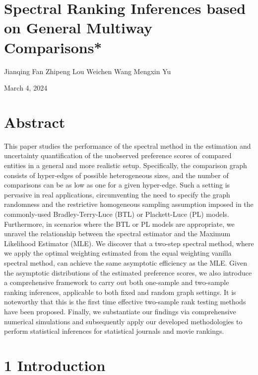



\section{Spectral Ranking Inferences based on General Multiway
Comparisons*}\label{spectral-ranking-inferences-based-on-general-multiway-comparisons}

Jianqing Fan Zhipeng Lou Weichen Wang Mengxin Yu

March 4, 2024

\section{Abstract}\label{abstract}

This paper studies the performance of the spectral method in the estimation and uncertainty quantification of the unobserved preference scores of compared entities in a general and more realistic setup. Specifically, the comparison graph consists of hyper-edges of possible heterogeneous sizes, and the number of comparisons can be as low as one for a given hyper-edge. Such a setting is pervasive in real applications, circumventing the need to specify the graph randomness and the restrictive homogeneous sampling assumption imposed in the commonly-used Bradley-Terry-Luce (BTL) or Plackett-Luce (PL) models. Furthermore, in scenarios where the BTL or PL models are appropriate, we unravel the relationship between the spectral estimator and the Maximum Likelihood Estimator (MLE). We discover that a two-step spectral method, where we apply the optimal weighting estimated from the equal weighting vanilla spectral method, can achieve the same asymptotic efficiency as the MLE. Given the asymptotic distributions of the estimated preference scores, we also introduce a comprehensive framework to carry out both one-sample and two-sample ranking inferences, applicable to both fixed and random graph settings. It is noteworthy that this is the first time effective two-sample rank testing methods have been proposed. Finally, we substantiate our findings via comprehensive numerical simulations and subsequently apply our developed methodologies to perform statistical inferences for statistical journals and movie rankings.

\section{1 Introduction}\label{introduction}

